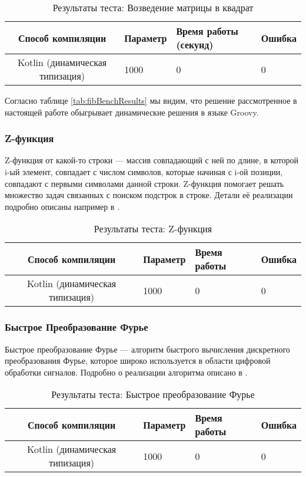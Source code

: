 \begin{table}[h]
\caption{\label{tab:matrixSquareBenchResults}Результаты теста: Возведение матрицы в квадрат}
\begin{center}
\begin{tabular}{|c|l|l|l|}
\hline
Способ компиляции & Параметр	& Время работы (секунд) & Ошибка \\

\hline
Kotlin (динамическая типизация) & 1000 & 0 & 0 \\
\hline
\end{tabular}
\end{center}
\end{table} 


Согласно таблице \ref{tab:fibBenchResults} мы видим, что решение рассмотренное в настоящей работе обыгрывает динамические решения в языке Groovy.

\subsubsection{Z-функция}


Z-функция от какой-то строки --- массив совпадающий с ней по длине, в которой i-ый элемент, совпадает с числом символов, которые начиная с i-ой позиции, совпадают с первыми символами данной строки. Z-функция помогает решать множество задач связанных с поиском подстрок в строке.
Детали её реализации подробно описаны например в \cite{algo:gusfield1997algorithms}.

\begin{table}[h]
\caption{\label{tab:zFunctionBenchResults}Результаты теста: Z-функция}
\begin{center}
\begin{tabular}{|c|l|l|l|}
\hline
Способ компиляции & Параметр	& Время работы & Ошибка \\
\hline
Kotlin (динамическая типизация) & 1000 & 0 & 0 \\
\hline
\end{tabular}
\end{center}
\end{table} 

\subsubsection{Быстрое Преобразование Фурье}

Быстрое преобразование Фурье --- алгоритм быстрого вычисления дискретного преобразования Фурье, которое широко используется в области цифровой обработки сигналов. Подробно о реализации алгоритма описано в \cite{algo:dasgypta2014algo}.

\begin{table}[h]
\caption{\label{tab:fftResults}Результаты теста: Быстрое преобразование Фурье}
\begin{center}
\begin{tabular}{|c|l|l|l|}
\hline
Способ компиляции & Параметр	& Время работы & Ошибка \\
\hline
Kotlin (динамическая типизация) & 1000 & 0 & 0 \\
\hline
\end{tabular}
\end{center}
\end{table} 